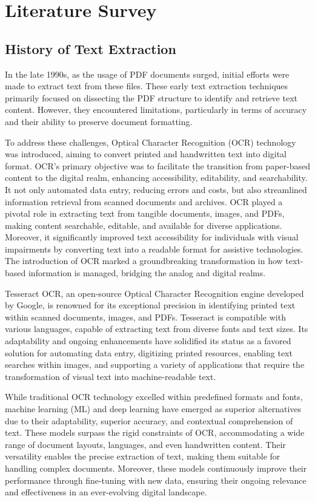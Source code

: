 \documentclass[conference]{IEEEtran}
\begin{document}
\section{Literature Survey}

\subsection{History of Text Extraction}

In the late 1990s, as the usage of PDF documents surged, initial efforts were made to extract text from these files. These early text extraction techniques primarily focused on dissecting the PDF structure to identify and retrieve text content. However, they encountered limitations, particularly in terms of accuracy and their ability to preserve document formatting. 

To address these challenges, Optical Character Recognition (OCR) technology was introduced, aiming to convert printed and handwritten text into digital format. OCR's primary objective was to facilitate the transition from paper-based content to the digital realm, enhancing accessibility, editability, and searchability. It not only automated data entry, reducing errors and costs, but also streamlined information retrieval from scanned documents and archives. OCR played a pivotal role in extracting text from tangible documents, images, and PDFs, making content searchable, editable, and available for diverse applications. Moreover, it significantly improved text accessibility for individuals with visual impairments by converting text into a readable format for assistive technologies. The introduction of OCR marked a groundbreaking transformation in how text-based information is managed, bridging the analog and digital realms.

Tesseract OCR, an open-source Optical Character Recognition engine developed by Google, is renowned for its exceptional precision in identifying printed text within scanned documents, images, and PDFs. Tesseract is compatible with various languages, capable of extracting text from diverse fonts and text sizes. Its adaptability and ongoing enhancements have solidified its status as a favored solution for automating data entry, digitizing printed resources, enabling text searches within images, and supporting a variety of applications that require the transformation of visual text into machine-readable text.

While traditional OCR technology excelled within predefined formats and fonts, machine learning (ML) and deep learning have emerged as superior alternatives due to their adaptability, superior accuracy, and contextual comprehension of text. These models surpass the rigid constraints of OCR, accommodating a wide range of document layouts, languages, and even handwritten content. Their versatility enables the precise extraction of text, making them suitable for handling complex documents. Moreover, these models continuously improve their performance through fine-tuning with new data, ensuring their ongoing relevance and effectiveness in an ever-evolving digital landscape.
\end{document}
